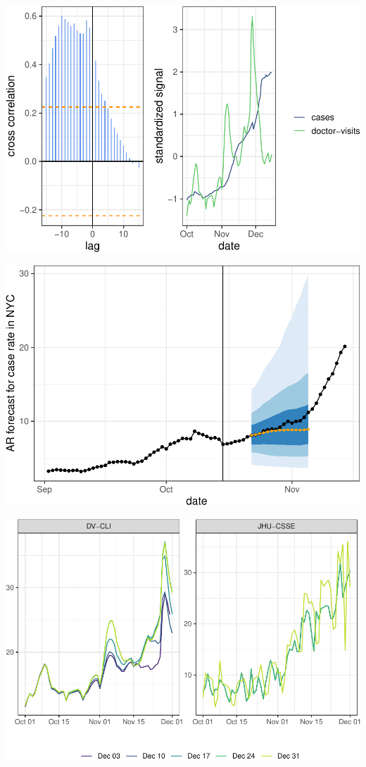 \documentclass[9pt,twoside,lineno]{pnas-new}
\begin{document}
\begin{center}\includegraphics[width=\linewidth]{fig/ccf-dv-finalized-1} \end{center}

\begin{center}\includegraphics[width=\linewidth]{fig/ny-trajectory-1} \end{center}

\begin{center}\includegraphics[width=\linewidth]{fig/revisions-dv-jhu-1} \end{center}
\end{document}
